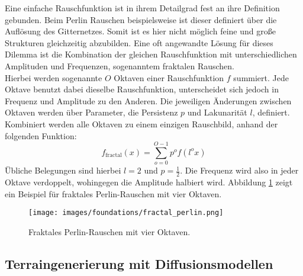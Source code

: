 Eine einfache Rauschfunktion ist in ihrem Detailgrad fest an ihre Definition gebunden. Beim Perlin Rauschen beispielsweise ist dieser definiert über die Auflösung des Gitternetzes. Somit ist es hier nicht möglich feine und große Strukturen gleichzeitig abzubilden. Eine oft angewandte Lösung für dieses Dilemma ist die Kombination der gleichen Rauschfunktion mit unterschiedlichen Amplituden und Frequenzen, sogenanntem fraktalen Rauschen. \\
Hierbei werden sogenannte $O$ Oktaven einer Rauschfunktion $f$ summiert. Jede  Oktave benutzt dabei dieselbe Rauschfunktion, unterscheidet sich jedoch in Frequenz und Amplitude zu den Anderen. Die jeweiligen Änderungen zwischen Oktaven werden über Parameter, die Persistenz $p$ und Lakunarität $l$, definiert. Kombiniert werden alle Oktaven zu einem einzigen Rauschbild, anhand der folgenden Funktion:  
\begin{equation}
    f_\text{fractal}(x) = \sum_{o=0}^{O-1} p^{o}f(l^ox)
\end{equation}
Übliche Belegungen sind hierbei $l=2$ und $p=\frac{1}{2}$. Die Frequenz wird also in jeder Oktave verdoppelt, wohingegen die Amplitude halbiert wird. Abbildung \ref{fig:fractal_perlin} zeigt ein Beispiel für fraktales Perlin-Rauschen mit vier Oktaven.

\begin{figure}[ht]
    \centering
    \texttt{[image: images/foundations/fractal\_perlin.png]} 
    \caption{Fraktales Perlin-Rauschen mit vier Oktaven.}
    \label{fig:fractal_perlin}
\end{figure}

\subsection{Terraingenerierung mit Diffusionsmodellen}

